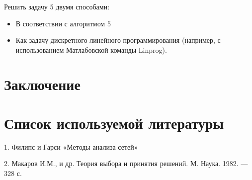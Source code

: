 \documentclass[a4paper, 12pt]{article}		%
\begin{document}
Решить задачу 5 двумя способами:

\begin{itemize}
\item В соответствии с алгоритмом 5
\item Как задачу дискретного линейного программирования (например, с использованием Матлабовской команды Linprog).
\end{itemize}


%
\newpage
\section*{Заключение}


%
\newpage
\section*{Список используемой литературы}

1.  Филипс и Гарси «Методы анализа сетей»

2. Макаров И.М., и др. Теория выбора и принятия решений. М. Наука. 1982. — 328 с.

\end{document}
